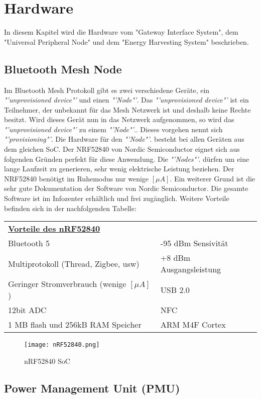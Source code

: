 \clearpage
\section{Hardware}\label{sec:Hardware}
In diesem Kapitel wird die Hardware vom "Gateway Interface System", dem "Universal Peripheral Node" und dem "Energy Harvesting System" beschrieben. 


\subsection{Bluetooth Mesh Node}\label{subsec:BMN}
Im Bluetooth Mesh Protokoll gibt es zwei verschiedene  Geräte, ein \textit{"'unprovisioned device"'} und einen \textit{"'Node"'}. Das \textit{"'unprovisioned device"'}  ist ein Teilnehmer, der unbekannt für das Mesh Netzwerk ist und deshalb keine Rechte besitzt. Wird dieses Gerät nun in das Netzwerk aufgenommen, so wird das \textit{"'unprovisioned device"'}  zu einem \textit{"'Node"'}.. Dieses vorgehen nennt sich \textit{"'provisioning"'}. Die Hardware für den \textit{"'Node"'}. besteht bei allen Geräten aus dem gleichen SoC. Der NRF52840 von Nordic Semiconductor eignet sich aus folgenden Gründen perfekt für diese Anwendung. Die \textit{"'Nodes"'}. dürfen um eine lange Laufzeit zu generieren, sehr wenig elektrische Leistung beziehen. Der NRF52840 benötigt im Ruhemodus nur wenige $[\mu A]$. Ein weiterer Grund ist die sehr gute Dokumentation der Software von Nordic Semiconductor. Die gesamte Software ist im Infozenter erhältlich und frei zugänglich. Weitere Vorteile befinden sich in der nachfolgenden Tabelle:


\begin{table}[h]
	\begin{tabular}{ll}
		\multicolumn{2}{l}{{\ul \textbf{Vorteile des nRF52840}}}       \\
		Bluetooth 5                          											   & -95 dBm Sensivität      \\
		Multiprotokoll (Thread, Zigbee, usw) 						   & +8 dBm Ausgangsleistung \\
		Geringer Stromverbrauch  (wenige $[\mu A]$)      	& USB 2.0                 \\
		12bit ADC                            												& NFC                     \\
		1 MB flash und 256kB RAM Speicher    						& ARM M4F Cortex         
	\end{tabular}
\end{table}


\begin{figure}[h]
	\centering
	\texttt{[image: nRF52840.png]}
	\caption{nRF52840 SoC}
	\label{img:nRF52840}
\end{figure} 


\subsection{Power Management Unit (PMU)}\label{subsec:PMU}
